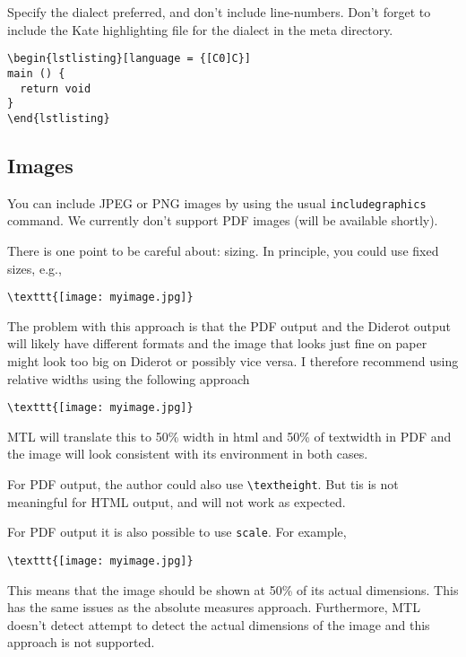 \begin{example}
Specify the dialect preferred, and don't include line-numbers.
%
Don't forget to include the Kate highlighting file for the dialect in the meta directory.

\begin{verbatim}
\begin{lstlisting}[language = {[C0]C}]
main () {
  return void
}
\end{lstlisting}
\end{verbatim}
\end{example}

\subsection{Images}

You can include JPEG or PNG images by using the usual \lstinline`includegraphics` command.  
%
We currently don't support PDF images (will be available shortly).

There is one point to be careful about: sizing.  
%
In principle, you could use fixed sizes, e.g.,
\begin{lstlisting}
\texttt{[image: myimage.jpg]}
\end{lstlisting}
%
The problem with this approach is that the PDF output and the Diderot output will likely have different formats and the image that looks just fine on paper might look too big on Diderot or possibly vice versa.
%
I therefore recommend using relative widths using the following approach
\begin{lstlisting}
\texttt{[image: myimage.jpg]}
\end{lstlisting}
MTL will translate this to 50\% width in html and 50\% of textwidth in PDF and the image will look consistent with its environment in both cases.  

\begin{note}
For PDF output, the author could also use \lstinline`\textheight`.
%
But tis is not meaningful for HTML output, and will not work as expected.
\end{note}

\begin{important}
For PDF output it is also possible to use \lstinline'scale'.  For example,
\begin{lstlisting}
\texttt{[image: myimage.jpg]}
\end{lstlisting}

This means that the image should be shown at 50\% of its actual dimensions.  This has  the same issues as the absolute measures approach. Furthermore, MTL doesn't detect attempt to detect the actual dimensions of the image and this approach is not supported.
\end{important}

